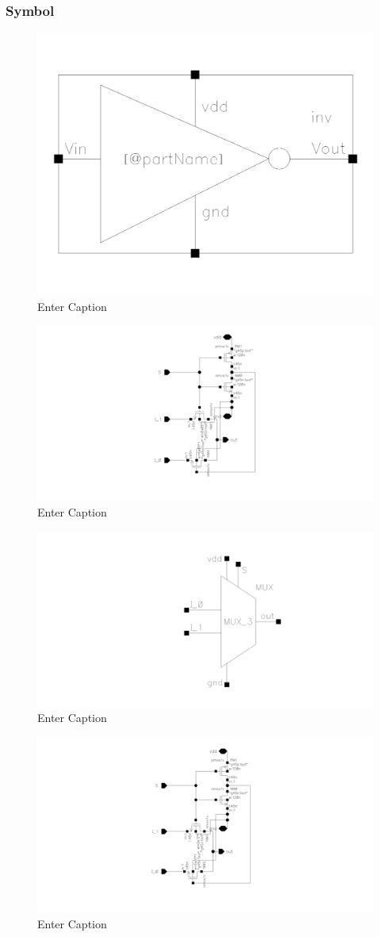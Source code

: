 \documentclass[12pt]{article}
\begin{document}
\subsubsection*{Symbol}

\begin{figure}[H]
    \centering
    \includegraphics[width=0.5\linewidth]{writeup//figures/inv_sym.png}
    \caption{Enter Caption}
\end{figure}

\begin{figure}[H]
    \centering
    \includegraphics[width=0.5\linewidth]{writeup//figures/mux_w0_opt.png}
    \caption{Enter Caption}
\end{figure}

\begin{figure}[H]
    \centering
    \includegraphics[width=0.5\linewidth]{writeup//figures/mux_w0_opt_sym.png}
    \caption{Enter Caption}
\end{figure}

\begin{figure}[H]
    \centering
    \includegraphics[width=0.5\linewidth]{writeup//figures/mux_w1_opt.png}
    \caption{Enter Caption}
\end{figure}
\end{document}
